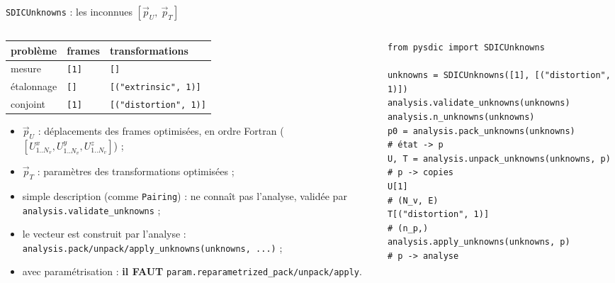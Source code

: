 \documentclass[aspectratio=169,11pt]{beamer}
\newcommand{\code}[1]{\texttt{\small #1}}
\newcommand{\cls}[1]{\textcolor{pyblue}{\texttt{#1}}}
\begin{document}
\begin{frame}[fragile]{\texttt{SDICUnknowns} : les inconnues $[\vec{p}_U,\ \vec{p}_T]$}
  \begin{columns}[T]
    \begin{column}{0.49\textwidth}\footnotesize
      \begin{center}
      \scriptsize
      \begin{tabular}{lll}
        \toprule
        problème & frames & transformations \\
        \midrule
        mesure     & \code{[1]} & \code{[]} \\
        étalonnage & \code{[]}  & \code{[("extrinsic", 1)]} \\
        conjoint   & \code{[1]} & \code{[("distortion", 1)]} \\
        \bottomrule
      \end{tabular}
      \end{center}
      \scriptsize
      \begin{itemize}\setlength{\itemsep}{1pt}
        \item $\vec{p}_U$ : déplacements des frames optimisées, en \alert{ordre
              Fortran} ($[U^x_{1..N_v}, U^y_{1..N_v}, U^z_{1..N_v}]$) ;
        \item $\vec{p}_T$ : paramètres des transformations optimisées ;
        \item \alert{simple description} (comme \cls{Pairing}) : ne connaît
              \alert{pas} l'analyse, validée par \texttt{analysis.validate\_unknowns} ;
        \item le vecteur est construit par l'analyse :
              \texttt{analysis.pack/unpack/apply\_unknowns(unknowns, ...)} ;
        \item avec paramétrisation : \textcolor{pyred}{\textbf{il FAUT}
              \texttt{param.reparametrized\_pack/unpack/apply}}.
      \end{itemize}
    \end{column}
    \begin{column}{0.49\textwidth}
\begin{lstlisting}[basicstyle=\ttfamily\tiny]
from pysdic import SDICUnknowns
 
unknowns = SDICUnknowns([1], [("distortion", 1)])
analysis.validate_unknowns(unknowns)
analysis.n_unknowns(unknowns)
p0 = analysis.pack_unknowns(unknowns)        # état -> p
U, T = analysis.unpack_unknowns(unknowns, p) # p -> copies
U[1]                                         # (N_v, E)
T[("distortion", 1)]                         # (n_p,)
analysis.apply_unknowns(unknowns, p)         # p -> analyse
 

\end{lstlisting}
\end{column}
\end{columns}
\end{frame}
\end{document}
